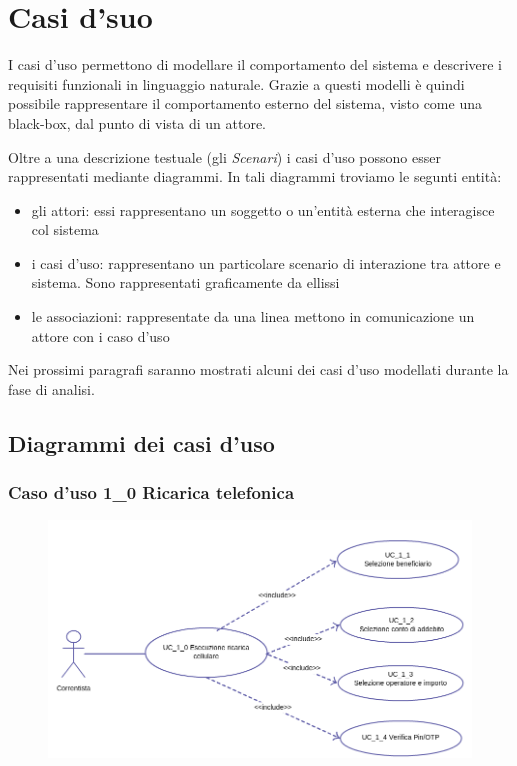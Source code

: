 \chapter{Casi d'suo}
I casi d'uso permettono di modellare il comportamento del sistema e descrivere i requisiti funzionali in linguaggio naturale. Grazie a questi modelli è quindi possibile rappresentare il comportamento esterno del sistema, visto come una black-box, dal punto di vista di un attore.

Oltre a una descrizione testuale (gli \emph{Scenari}) i casi d'uso possono esser rappresentati mediante diagrammi. In tali diagrammi troviamo le segunti entità:
 \begin{itemize}
  \item gli attori: essi rappresentano un soggetto o un'entità esterna che interagisce col sistema
  \item i casi d'uso: rappresentano un particolare scenario di interazione tra attore e sistema. Sono rappresentati graficamente da ellissi
  \item le associazioni: rappresentate da una linea mettono in comunicazione un attore con i caso d'uso
 \end{itemize}

 Nei prossimi paragrafi saranno mostrati alcuni dei casi d'uso modellati durante la fase di analisi.
 \section{Diagrammi dei casi d'uso}
 \subsection{Caso d'uso 1\_0 Ricarica telefonica}
	\begin{figure}[!htbp]
	  \centering
	  \includegraphics[scale=0.60]{casi_uso/ricarica.png}
	\end{figure}
 
